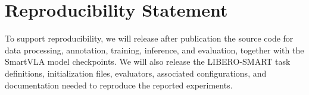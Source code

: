 \section*{Reproducibility Statement}
To support reproducibility, we will release
after publication the source code for data processing, annotation,
training, inference, and evaluation, together with the SmartVLA model
checkpoints. We will also release the LIBERO-SMART task definitions,
initialization files, evaluators, associated configurations, and
documentation needed to reproduce the reported experiments.


